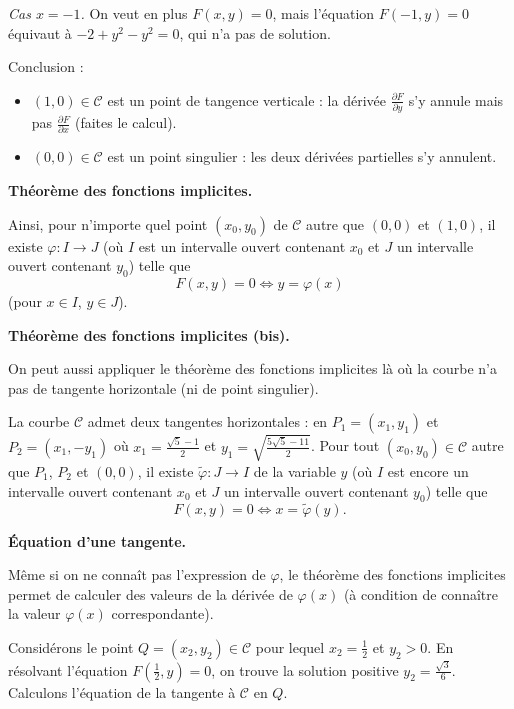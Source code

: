\documentclass[11pt, class=report,crop=false]{standalone}
\begin{document}
\emph{Cas $x=-1$.} On veut en plus $F(x,y)=0$, mais l'équation $F(-1,y)=0$ équivaut à 
$-2+y^2-y^2=0$, qui n'a pas de solution.

Conclusion :
\begin{itemize}
     \item $(1,0) \in \mathcal{C}$ est un point de tangence verticale : la dérivée $\frac{\partial F}{\partial y}$ s'y annule mais pas  $\frac{\partial F}{\partial x}$ (faites le calcul).
     
     \item $(0,0) \in \mathcal{C}$ est un point singulier : les deux dérivées partielles s'y annulent.
\end{itemize}

\bigskip

\textbf{Théorème des fonctions implicites.}

Ainsi, pour n'importe quel point $(x_0,y_0)$ de $\mathcal{C}$ autre que $(0,0)$ et $(1,0)$, il existe $\varphi :I \to J$ (où $I$ est un intervalle ouvert contenant $x_0$ et $J$ un intervalle ouvert contenant $y_0$) telle que 
$$F(x,y) = 0 \iff y = \varphi(x)$$
(pour $x \in I$, $y \in J$).


\bigskip

\textbf{Théorème des fonctions implicites (bis).}

On peut aussi appliquer le théorème des fonctions implicites là où la courbe n'a pas de tangente horizontale (ni de point singulier).

La courbe $\mathcal{C}$ admet deux tangentes horizontales : en $P_1=(x_1,y_1)$ et $P_2=(x_1,-y_1)$ où $x_1 = \frac{\sqrt5-1}{2}$ et $y_1 = \sqrt{\frac{5\sqrt{5}-11}{2}}$.
Pour tout $(x_0,y_0) \in \mathcal{C}$ autre que $P_1$, $P_2$ et $(0,0)$, il existe $\tilde\varphi : J \to I$ de la variable $y$ (où $I$ est encore un intervalle ouvert contenant $x_0$ et $J$ un intervalle ouvert contenant $y_0$) telle que 
$$F(x,y) = 0 \iff x = \tilde\varphi(y).$$


\bigskip

\textbf{\'Equation d'une tangente.}
  
Même si on ne connaît pas l'expression de $\varphi$, le théorème des fonctions implicites permet de calculer des valeurs de la dérivée de $\varphi(x)$ (à condition de connaître la valeur $\varphi(x)$ correspondante).

Considérons le point $Q=(x_2,y_2) \in \mathcal{C}$ pour lequel $x_2 = \frac12$ et $y_2>0$.
En résolvant l'équation $F(\frac12,y)=0$, on trouve la solution positive $y_2 = \frac{\sqrt3}{6}$. Calculons l'équation de la tangente à $\mathcal{C}$ en $Q$.
   
\end{document}
